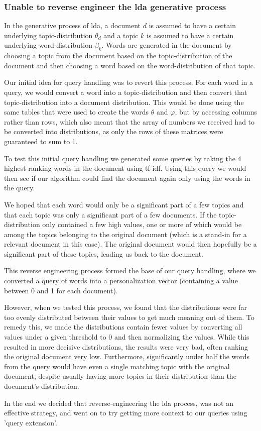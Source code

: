 \subsubsection{Unable to reverse engineer the \gls{lda} generative process}
In the generative process of \gls{lda}, a document $d$ is assumed to have a certain underlying topic-distribution $\theta_d$ and a topic $k$ is assumed to have a certain underlying word-distribution $\beta_k$.
Words are generated in the document by choosing a topic from the document based on the topic-distribution of the document and then choosing a word based on the word-distribution of that topic.

Our initial idea for query handling was to revert this process.
For each word in a query, we would convert a word into a topic-distribution and then convert that topic-distribution into a document distribution.
This would be done using the same tables that were used to create the words $\theta$ and $\varphi$, but by accessing columns rather than rows, which also meant that the array of numbers we received had to be converted into distributions, as only the rows of these matrices were guaranteed to sum to 1.

To test this initial query handling we generated some queries by taking the 4 highest-ranking words in the document using tf-idf. Using this query we would then see if our algorithm could find the document again only using the words in the query.

We hoped that each word would only be a significant part of a few topics and that each topic was only a significant part of a few documents.
If the topic-distribution only contained a few high values, one or more of which would be among the topics belonging to the original document (which is a stand-in for a relevant document in this case).
The original document would then hopefully be a significant part of these topics, leading us back to the document.

This reverse engineering process formed the base of our query handling, where we converted a query of words into a personalization vector (containing a value between 0 and 1 for each document).

However, when we tested this process, we found that the distributions were far too evenly distributed between their values to get much meaning out of them.
To remedy this, we made the distributions contain fewer values by converting all values under a given threshold to 0 and then normalizing the values.
While this resulted in more decisive distributions, the results were very bad, often ranking the original document very low.
Furthermore, significantly under half the words from the query would have even a single matching topic with the original document, despite usually having more topics in their distribution than the document's distribution.
 
In the end we decided that reverse-engineering the \gls{lda} process, was not an effective strategy, and went on to try getting more context to our queries using 'query extension'.
